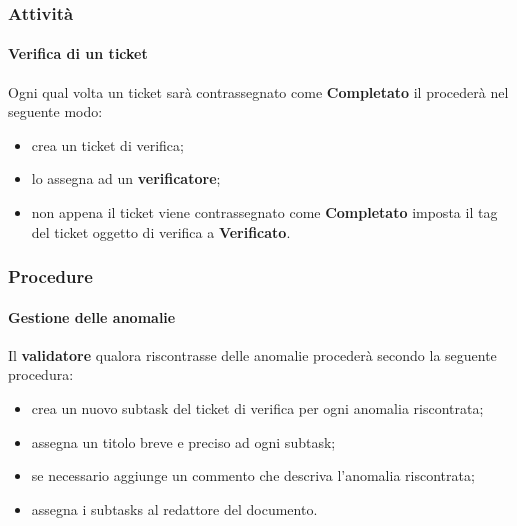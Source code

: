 \subsubsection{Attività}
	\paragraph{Verifica di un ticket}
	Ogni qual volta un ticket sarà contrassegnato come \textbf{Completato} il \RES procederà nel seguente modo: 
	\begin{itemize}
		\item crea un ticket di verifica;
		\item lo assegna ad un \textbf{verificatore};
		\item non appena il ticket viene contrassegnato come \textbf{Completato} imposta il tag del ticket oggetto di verifica a \textbf{Verificato}.
	\end{itemize}
\subsubsection{Procedure}
	\paragraph{Gestione delle anomalie}
			Il \textbf{validatore} qualora riscontrasse delle anomalie procederà secondo la seguente procedura:
			\begin{itemize}
				\item crea un nuovo subtask del ticket di verifica per ogni anomalia riscontrata;
				\item assegna un titolo breve e preciso ad ogni subtask;
				\item se necessario aggiunge un commento che descriva l'anomalia riscontrata;
				\item assegna i subtasks al redattore del documento.
			\end{itemize}